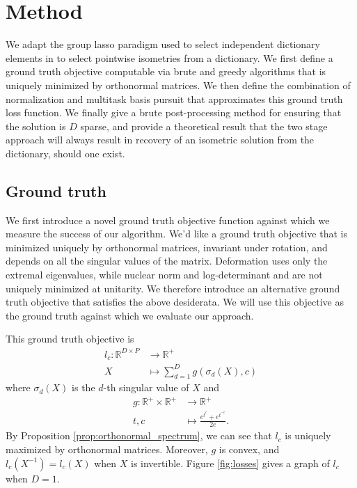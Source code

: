 \section{Method}

We adapt the group lasso paradigm used to select independent dictionary elements in \citet{Koelle2022-ju, Koelle2024-no} to select pointwise isometries from a dictionary.
We first define a ground truth objective computable via brute and greedy algorithms that is uniquely minimized by orthonormal matrices.
We then define the combination of normalization and multitask basis pursuit that approximates this ground truth loss function.
We finally give a brute post-processing method for ensuring that the solution is $D$ sparse, and provide a theoretical result that the two stage approach will always result in recovery of an isometric solution from the dictionary, should one exist.

\subsection{Ground truth}
\label{sec:ground_truth}

We first introduce a novel ground truth objective function against which we measure the success of our algorithm.
We'd like a ground truth objective that is minimized uniquely by orthonormal matrices, invariant under rotation, and depends on all the singular values of the matrix.
Deformation \citep{Kohli2021-lr} uses only the extremal eigenvalues, while nuclear norm and log-determinant \citep{Boyd2004-ql} and are not uniquely minimized at unitarity.
We therefore introduce an alternative ground truth objective that satisfies the above desiderata.
We will use this objective as the ground truth against which we evaluate our approach.

This ground truth objective is
\begin{align}
l_{c}: \mathbb R^{D \times P} &\to \mathbb R^{+} \\
X &\mapsto \sum_{d = 1}^D g(\sigma_d( X), c)
\end{align}
where $\sigma_d ( X)$ is the $d$-th singular value of $ X$ and
\begin{align}
g: \mathbb R^+ \times \mathbb R^+ &\to \mathbb R^+ \\
t,c &\mapsto \frac{e^{t^c} + e^{t^{-c}}}{2e}.
\end{align}
By Proposition \ref{prop:orthonormal_spectrum}, we can see that $l_c$ is uniquely maximized by orthonormal matrices.
Moreover, $g$ is convex, and $l_c( X^{-1}) = l_c( X)$ when $X$ is invertible.
Figure \ref{fig:losses} gives a graph of $l_c$ when $D=1$.

